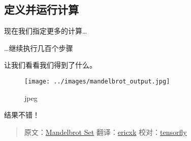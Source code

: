 \subsection{定义并运行计算
}\label{ux5b9aux4e49ux5e76ux8fd0ux884cux8ba1ux7b97}

现在我们指定更多的计算\ldots{}

\begin{Shaded}
\begin{Highlighting}[]
\OperatorTok{=} \OperatorTok{*}\OperatorTok{+} 

\OperatorTok{=} \OperatorTok{<} 

\CommentTok{#}
\CommentTok{#}
\OperatorTok{=} 
  \NormalTok{))}
  \NormalTok{)}
\end{Highlighting}
\end{Shaded}

\ldots{}继续执行几百个步骤

\begin{Shaded}
\begin{Highlighting}[]
  \NormalTok{(}
\end{Highlighting}
\end{Shaded}

让我们看看我们得到了什么。

\begin{Shaded}
\begin{Highlighting}[]
\NormalTok{())}
\end{Highlighting}
\end{Shaded}

\begin{figure}[htbp]
\centering
\texttt{[image: ../images/mandelbrot\_output.jpg]}
\caption{jpeg}
\end{figure}

结果不错！

\begin{quote}
原文：\href{http://tensorflow.org/tutorials/mandelbrot/index.md}{Mandelbrot
Set} 翻译：\href{https://github.com/ericxk}{ericxk}
校对：\href{https://github.com/tensorfly}{tensorfly}
\end{quote}